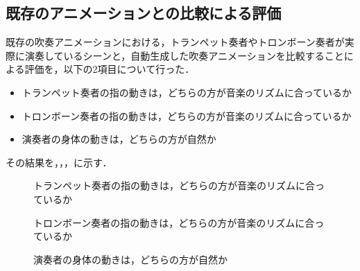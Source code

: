 \newpage
\subsection{既存のアニメーションとの比較による評価}
既存の吹奏アニメーションにおける，トランペット奏者やトロンボーン奏者が実際に演奏しているシーンと，自動生成した吹奏アニメーションを比較することによる評価を，以下の2項目について行った．
\begin{itemize}
	\item トランペット奏者の指の動きは，どちらの方が音楽のリズムに合っているか
	\item トロンボーン奏者の指の動きは，どちらの方が音楽のリズムに合っているか
	\item 演奏者の身体の動きは，どちらの方が自然か
\end{itemize}
その結果を，，，に示す．
\begin{figure}[!h]
	\centering
	\hspace{2mm}
	\caption{トランペット奏者の指の動きは，どちらの方が音楽のリズムに合っているか}
	\label{fig:Q2-tp}
\end{figure}
\begin{figure}[!h]
	\centering
	\caption{トロンボーン奏者の指の動きは，どちらの方が音楽のリズムに合っているか}
	\label{fig:Q2-tb}
\end{figure}
\begin{figure}[!h]
	\centering
	\caption{演奏者の身体の動きは，どちらの方が自然か}
	\label{fig:Q2-tptb}
\end{figure}

